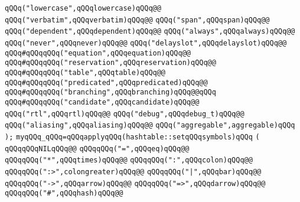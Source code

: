 \verb|qQQq("lowercase",qQQqlowercase)qQQq@@|\newline
\verb|qQQq("verbatim",qQQqverbatim)qQQq@@|\newline
\verb|qQQq("span",qQQqspan)qQQq@@|\newline
\verb|qQQq("dependent",qQQqdependent)qQQq@@|\newline
\verb|qQQq("always",qQQqalways)qQQq@@|\newline
\verb|qQQq("never",qQQqnever)qQQq@@|\newline
\verb|qQQq("delayslot",qQQqdelayslot)qQQq@@|\newline
\verb|qQQq#qQQqqQQq("equation",qQQqequation)qQQq@@|\newline
\verb|qQQq#qQQqqQQq("reservation",qQQqreservation)qQQq@@|\newline
\verb|qQQq#qQQqqQQq("table",qQQqtable)qQQq@@|\newline
\verb|qQQq#qQQqqQQq("predicated",qQQqpredicated)qQQq@@|\newline
\verb|qQQq#qQQqqQQq("branching",qQQqbranching)qQQq@@qQQq|\newline
\verb|qQQq#qQQqqQQq("candidate",qQQqcandidate)qQQq@@|\newline
\verb|qQQq("rtl",qQQqrtl)qQQq@@|\newline
\verb|qQQq("debug",qQQqdebug_t)qQQq@@|\newline
\verb|qQQq("aliasing",qQQqaliasing)qQQq@@|\newline
\verb|qQQq("aggregable",aggregable)qQQq|\newline
\verb|);|\newline
\newline
\verb|myqQQq_qQQq=qQQqapplyqQQq(hashtable::setqQQqsymbols)qQQq|\newline
\verb|(|\newline
\verb|qQQqqQQqNILqQQq@@|\newline
\verb|qQQqqQQq("=",qQQqeq)qQQq@@|\newline
\verb|qQQqqQQq("*",qQQqtimes)qQQq@@|\newline
\verb|qQQqqQQq(":",qQQqcolon)qQQq@@|\newline
\verb|qQQqqQQq(":>",colongreater)qQQq@@|\newline
\verb|qQQqqQQq("|\verb#|",qQQqbar)qQQq@@#\newline
\verb|qQQqqQQq("->",qQQqarrow)qQQq@@|\newline
\verb|qQQqqQQq("=>",qQQqdarrow)qQQq@@|\newline
\verb|qQQqqQQq("#",qQQqhash)qQQq@@|\newline
